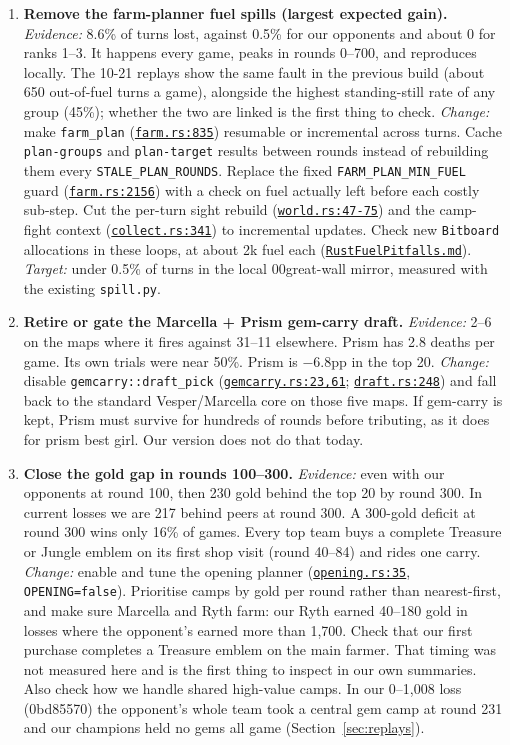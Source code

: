 \documentclass[11pt,a4paper]{article}
\newcommand{\repo}{file:///Users/tristanbasri/Desktop/Code/cambridge-battlecode-s2}
\newcommand{\code}[2]{\href{\repo/#1}{\texttt{\textcolor{cOurs!80!black}{#2}}}}
\newcommand{\vfive}{bots/bot-v5-r175199/src}
\begin{document}
\begin{enumerate}[leftmargin=1.4em, itemsep=0.45em]
\item \textbf{Remove the farm-planner fuel spills (largest expected gain).} \emph{Evidence:} 8.6\% of turns lost, against 0.5\% for our opponents and about 0 for ranks 1--3. It happens every game, peaks in rounds 0--700, and reproduces locally. The 10-21 replays show the same fault in the previous build (about 650 out-of-fuel turns a game), alongside the highest standing-still rate of any group (45\%); whether the two are linked is the first thing to check. \emph{Change:} make \texttt{farm\_plan} (\code{\vfive/common/farm.rs}{farm.rs:835}) resumable or incremental across turns. Cache \texttt{plan-groups} and \texttt{plan-target} results between rounds instead of rebuilding them every \texttt{STALE\_PLAN\_ROUNDS}. Replace the fixed \texttt{FARM\_PLAN\_MIN\_FUEL} guard (\code{\vfive/common/farm.rs}{farm.rs:2156}) with a check on fuel actually left before each costly sub-step. Cut the per-turn sight rebuild (\code{\vfive/common/world.rs}{world.rs:47-75}) and the camp-fight context (\code{\vfive/common/collect.rs}{collect.rs:341}) to incremental updates. Check new \texttt{Bitboard} allocations in these loops, at about 2k fuel each (\code{docs/RustFuelPitfalls.md}{RustFuelPitfalls.md}). \emph{Target:} under 0.5\% of turns in the local 00great-wall mirror, measured with the existing \texttt{spill.py}.

\item \textbf{Retire or gate the Marcella + Prism gem-carry draft.} \emph{Evidence:} 2--6 on the maps where it fires against 31--11 elsewhere. Prism has 2.8 deaths per game. Its own trials were near 50\%. Prism is $-$6.8pp in the top 20. \emph{Change:} disable \texttt{gemcarry::draft\_pick} (\code{\vfive/common/gemcarry.rs}{gemcarry.rs:23,61}; \code{\vfive/draft.rs}{draft.rs:248}) and fall back to the standard Vesper/Marcella core on those five maps. If gem-carry is kept, Prism must survive for hundreds of rounds before tributing, as it does for prism best girl. Our version does not do that today.

\item \textbf{Close the gold gap in rounds 100--300.} \emph{Evidence:} even with our opponents at round 100, then 230 gold behind the top 20 by round 300. In current losses we are 217 behind peers at round 300. A 300-gold deficit at round 300 wins only 16\% of games. Every top team buys a complete Treasure or Jungle emblem on its first shop visit (round 40--84) and rides one carry. \emph{Change:} enable and tune the opening planner (\code{\vfive/opening.rs}{opening.rs:35}, \texttt{OPENING=false}). Prioritise camps by gold per round rather than nearest-first, and make sure Marcella and Ryth farm: our Ryth earned 40--180 gold in losses where the opponent's earned more than 1,700. Check that our first purchase completes a Treasure emblem on the main farmer. That timing was not measured here and is the first thing to inspect in our own summaries. Also check how we handle shared high-value camps. In our 0--1,008 loss (0bd85570) the opponent's whole team took a central gem camp at round 231 and our champions held no gems all game (Section~\ref{sec:replays}).


\end{enumerate}
\end{document}
